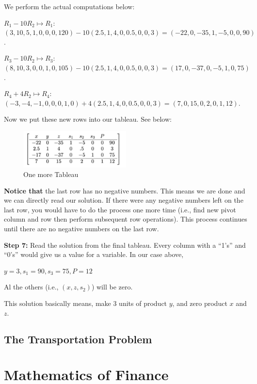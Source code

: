 \documentclass[
  letterpaper,
  DIV=11,
  numbers=noendperiod]{scrreprt}
\begin{document}
We perform the actual computations below:

\(R_1 - 10R_2\mapsto R_1\):
\((3,10,5,1,0,0,0,120) - 10(2.5,1,4,0,0.5,0,0,3)=(-22,0,-35,1,-5,0,0,90)\).

\(R_3 - 10R_2\mapsto R_3\):
\((8,10,3,0,0,1,0,105) - 10(2.5,1,4,0,0.5,0,0,3)=(17,0,-37,0,-5,1,0,75)\).

\(R_4 + 4R_2\mapsto R_4\):
\((-3,-4,-1,0,0,0,1,0) + 4(2.5,1,4,0,0.5,0,0,3)=(7,0,15,0,2,0,1,12)\).

Now we put these new rows into our tableau. See below:

\begin{figure}

{\centering \includegraphics[width=0.5\textwidth,height=\textheight]{images/g.jpeg}

}

\caption{One more Tableau}

\end{figure}

\textbf{Notice that} the last row has no negative numbers. This means we
are done and we can directly read our solution. If there were any
negative numbers left on the last row, you would have to do the process
one more time (i.e., find new pivot column and row then perform
subsequent row operations). This process continues until there are no
negative numbers on the last row.

\textbf{Step 7:} Read the solution from the final tableau. Every column
with a ``1's'' and ``0's'' would give us a value for a variable. In our
case above,

\(y=3, s_1=90, s_3=75, P=12\)

Al the others (i.e., \((x,z,s_2)\)) will be zero.

This solution basically means, make 3 units of product \(y\), and zero
product \(x\) and \(z\).

\hypertarget{the-transportation-problem-1}{%
\chapter{The Transportation
Problem}\label{the-transportation-problem-1}}

\part{Mathematics of Finance}
\end{document}
